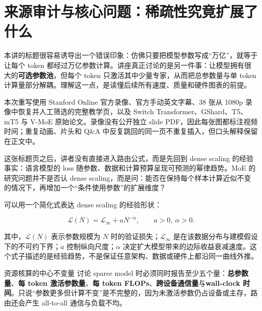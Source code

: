 \section{来源审计与核心问题：稀疏性究竟扩展了什么}

本讲的标题很容易诱导出一个错误印象：仿佛只要把模型参数写成“万亿”，就等于让每个 token 都经过万亿参数计算。讲座真正讨论的是另一件事：让模型拥有很大的\textbf{可选参数池}，但每个 token 只激活其中少量专家，从而把总参数量与单 token 计算量部分解耦。理解这一点，是读懂后续所有速度、质量和硬件图表的前提。

本次重写使用 Stanford Online 官方录像、官方手动英文字幕、38 张从 1080p 录像中恢复并人工筛选的完整教学页，以及 Switch Transformer、GShard、T5、mT5 与 V-MoE 原始论文。录像没有公开独立 slide PDF，因此每张图都标注视频时间；重复动画、片头和 Q\&A 中反复跳回的同一页不重复插入，但口头解释保留在正文中。


这张标题页之后，讲者没有直接进入路由公式，而是先回到 dense scaling 的经验事实：语言模型的 loss 随参数、数据和计算预算呈现可预测的幂律趋势。MoE 的研究问题并不是否认 dense scaling，而是问：能否在保持每个样本计算近似不变的情况下，再增加一个“条件使用参数”的扩展维度？


可以用一个简化式表达 dense scaling 的经验形状：

\[
\mathcal{L}(N)=\mathcal{L}_{\infty}+aN^{-\alpha},\qquad a>0,\ \alpha>0.
\]

其中，$\mathcal{L}(N)$ 表示参数规模为 $N$ 时的验证损失；$\mathcal{L}_{\infty}$ 是在该数据分布与建模假设下的不可约下界；$a$ 控制纵向尺度；$\alpha$ 决定扩大模型带来的边际收益衰减速度。这个式子描述的是经验趋势，不是保证任意架构、数据或硬件上都沿同一曲线外推。



\begin{importantbox}{资源核算的中心不变量}
讨论 sparse model 时必须同时报告至少五个量：\textbf{总参数量}、\textbf{每 token 激活参数量}、\textbf{每 token FLOPs}、\textbf{跨设备通信量}与\textbf{wall-clock 时间}。只说“参数更多但计算不变”是不完整的，因为未激活参数仍占设备或主存，路由还会产生 all-to-all 通信与负载不均。
\end{importantbox}

